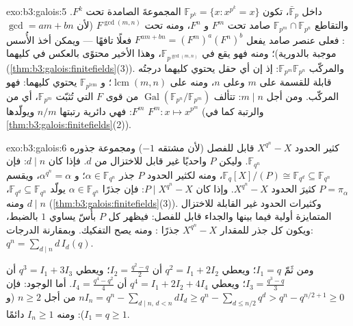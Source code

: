 \begin{solution}{exo:b3:galois:5}
داخل $\bar{\mathbb F}_p$، تكون $\mathbb F_{p^k} = \{x : x^{p^k} =
x\}$ المجموعةَ الصامدة تحت $F^k$. والتقاطع
$\mathbb F_{p^m}
\cap \mathbb F_{p^n}$ صامد تحت $F^m$ و $F^n$، ومنه تحت $F^{\gcd(m,n)}$ (لأن
$\gcd = am + bn$: فعلى عنصر صامد يفعل $F^{am +
bn} = (F^m)^a(F^n)^b$ فعلًا تافهًا ---
ويمكن أخذ الأُسس موجبة بالدورية)؛ ومنه فهو يقع في $\mathbb
F_{p^{\gcd(m,n)}}$، وهذا
الأخير محتوًى بالعكس في كليهما (\cref{thm:b3:galois:finitefields}(3)). والمركّب
$\mathbb
F_{p^m}\mathbb F_{p^n}$: إذ إن أي حقل يحتوي كليهما درجتُه قابلة للقسمة على $m$
وعلى $n$، ومنه على $\operatorname{lcm}(m,n)$؛ و $\mathbb F_{p^{\operatorname{lcm}}}$ يحتوي كليهما: فهو المركّب.
ومن أجل $m \mid n$: تتألف $\operatorname{Gal}(\mathbb
F_{p^n}/\mathbb F_{p^m})$ من قوى $F$ التي تُثبّت $\mathbb F_{p^m}$،
أي من $F^m$: فهي دائرية رتبتها $n/m$ ويولّدها $F^m \colon x \mapsto x^{p^m}$ (والرتبة
كما في \cref{thm:b3:galois:finitefields}(2)).
\end{solution}

\begin{solution}{exo:b3:galois:6}
كثير الحدود $X^{q^n} - X$ قابل للفصل (لأن مشتقه $-1$) ومجموعة
جذوره $\mathbb F_{q^n}$. وليكن $P$ واحديًا غير قابل للاختزال من  $d$.
فإذا كان $d \mid n$: فإن $\mathbb F_q[X]/(P) \cong \mathbb F_{q^d}
\subseteq \mathbb F_{q^n}$، ومنه لكثير الحدود $P$ جذر $\alpha \in
\mathbb F_{q^n}$؛ و
$\alpha^{q^n} = \alpha$، ويقسم $P =
\pi_\alpha$ كثيرَ الحدود $X^{q^n} - X$. وإذا كان
$P \mid X^{q^n} - X$: فإن جذرًا $\alpha \in \mathbb F_{q^n}$ يولّد $\mathbb F_{q^d}
\subseteq \mathbb F_{q^n}$، ومنه $d \mid n$
(\cref{thm:b3:galois:finitefields}(3)). وكثيرات الحدود غير القابلة للاختزال المتمايزة
أولية فيما بينها والجداء قابل للفصل: فيظهر كل $P$ بأُسّ يساوي $1$
بالضبط، ويكون كل جذر للمقدار $X^{q^n}-X$ جذرًا : ومنه
يصح التفكيك. وبمقارنة الدرجات: $q^n = \sum_{d\mid n} d\,I_d(q)$.

ومن ثَمّ $I_1 = q$؛ ويعطي $q^2 = I_1 + 2I_2$ أن $I_2 =
\frac{q^2 - q}2$؛ ويعطي $q^3 = I_1 + 3I_3$ أن
$I_3 = \frac{q^3 -
q}3$؛ ويعطي $q^4 = I_1 + 2I_2 + 4I_4$ أن $I_4 = \frac{q^4 -
q^2}4$. أما الوجود: فإن $nI_n = q^n - \sum_{d \mid n,\, d < n}
dI_d \geq q^n - \sum_{d \leq n/2} q^d > q^n - q^{n/2 + 1} \geq
0$ من أجل
$n \geq 2$ (و $I_1 = q \geq 1$): ومنه $I_n \geq 1$ دائمًا.
\end{solution}

